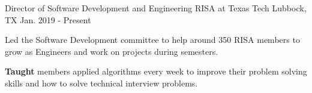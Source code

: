 
\begin{cventries}
    \cventry
    {Director of Software Development and Engineering} %
    {RISA at Texas Tech} %
    {Lubbock, TX} %
    {Jan. 2019 - Present} %
    {
      \begin{cvitems} %
        \item {Led the Software Development committee to help around 350 RISA members to grow as Engineers and work on projects during semesters. }
        \item { \textbf{Taught} members applied algorithms every week to improve their problem solving skills and how to solve technical interview problems. }
      \end{cvitems}
    }
\end{cventries}

